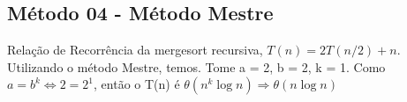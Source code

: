 \subsection{Método 04 - Método Mestre}
Relação de Recorrência da mergesort recursiva, $T(n) = 2T(n/2) + n$. Utilizando o método Mestre, temos.
Tome a = 2, b = 2, k = 1. Como $a = b^k \Leftrightarrow 2 = 2^1$, então o T(n) é $\theta(n^k \log{n}) \Rightarrow \theta(n \log{n})$